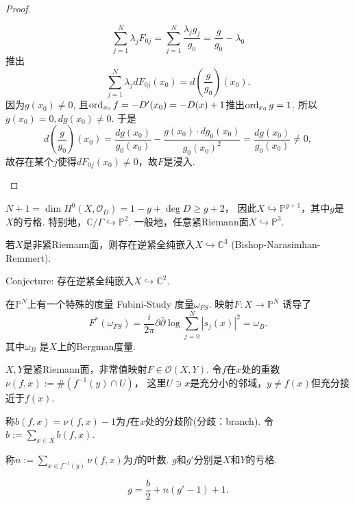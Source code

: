 \begin{proof}
\begin{enumerate}
		$$\sum_{j=1}^N \lambda_j F_{0j}
        =\sum_{j=1}^N \frac{\lambda_jg_j}{g_0}=\frac{g}{g_0}-\lambda_0$$
		推出
		$$\sum_{j=1}^N \lambda_jdF_{0j}(x_0)=d\left(\frac{g}{g_0}\right)(x_0).$$
		因为$g(x_0)\neq 0$, 且$\operatorname{ord}_{x_0}f=-D'(x_0)=-D(x)+1$推出$\operatorname{ord}_{x_0}g=1$. 
        所以 $g(x_0)=0,dg(x_0)\neq 0$. 于是
		$$d\left(\frac{g}{g_0}\right)(x_0)=\frac{dg(x_0)}{g_0(x_0)}
        -\frac{g(x_0)\cdot dg_0(x_0)}{g_0(x_0)^2}=\frac{d g(x_0)}{g_0(x_0)}\neq 0,$$
		故存在某个$j$使得$dF_{0j}(x_0)\neq 0$，故$F$是浸入.\qedhere
	\end{enumerate}
\end{proof}

\begin{remark}
	$N+1=\dim H^0(X,\mathcal{O}_D)= 1-g+\deg D\geq g+2$，
    因此$X\hookrightarrow \mathbb{P}^{g+1}$，其中$g$是$X$的亏格. 
    特别地，$\mathbb{C}/\Gamma \hookrightarrow \mathbb{P}^2$.
	一般地，任意紧Riemann面$X\hookrightarrow \mathbb{P}^3$.
\end{remark}
	
\begin{remark}
	若$X$是非紧Riemann面，则存在逆紧全纯嵌入$X\hookrightarrow \mathbb{C}^3$
    (Bishop-Narasimhan-Remmert). 

	Conjecture: 存在逆紧全纯嵌入$X\hookrightarrow \mathbb{C}^2$.
\end{remark}

\begin{remark}
    在$\mathbb{P}^N$上有一个特殊的度量 Fubini-Study 度量$\omega_{FS}$. 映射$F:X\to\mathbb{P}^N$ 诱导了
    $$F^*(\omega_{FS}) = \frac{i}{2\pi} \partial \bar{\partial} \log \sum_{j=0}^N |s_j(x)|^2 = \omega_B.$$
    其中$\omega_B$ 是$X$上的Bergman度量.
\end{remark}

\begin{definition}
	$X, Y$是紧Riemann面，非常值映射$F\in \mathcal{O}(X,Y)$. 
    令$f$在$x$处的重数$\nu(f,x):=\# (f^{-1}(y)\cap U)$，
    这里$U\ni x$是充分小的邻域，$y\neq f(x)$但充分接近于$f(x)$.

	称$b(f,x)=\nu(f,x)-1$为$f$在$x$处的分歧阶(分歧：branch). 
    令$b:=\sum\limits_{x\in X}b(f,x)$.\par
	称$n:=\sum\limits_{x\in f^{-1}(y)} \nu(f,x)$为$f$的叶数. 
    $g$和$g'$分别是$X$和$Y$的亏格.
\end{definition}

\begin{theorem}
	$$g=\frac{b}{2}+n(g'-1)+1.$$
\end{theorem}

